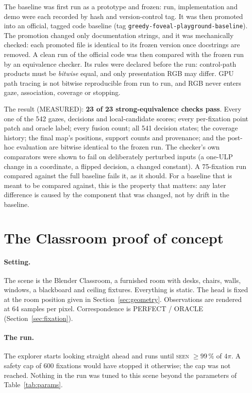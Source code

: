 \documentclass[11pt,a4paper]{article}
\newcommand{\code}[1]{\texttt{\small #1}}
\newcommand{\pct}[1]{#1\,\%}
\begin{document}
The baseline was first run as a prototype and frozen: run, implementation and demo were each recorded by hash and
version-control tag. It was then promoted into an official, tagged code baseline (tag
\code{greedy-foveal-playground-baseline}). The promotion changed only documentation strings, and it was mechanically
checked: each promoted file is identical to its frozen version once docstrings are removed. A clean run of the official
code was then compared with the frozen run by an equivalence checker. Its rules were declared before the run:
control-path products must be \emph{bitwise} equal, and only presentation RGB may differ. GPU path tracing is not
bitwise reproducible from run to run, and RGB never enters gaze, association, coverage or stopping.

The result (MEASURED): \textbf{23 of 23 strong-equivalence checks pass}. Every one of the 542 gazes, decisions and
local-candidate scores; every per-fixation point patch and oracle label; every fusion count; all 541 decision states;
the coverage history; the final map's positions, support counts and provenance; and the post-hoc evaluation are
bitwise identical to the frozen run. The checker's own comparators were shown to fail on deliberately perturbed inputs
(a one-ULP change in a coordinate, a flipped decision, a changed constant). A 75-fixation run compared against the
full baseline fails it, as it should. For a baseline that is meant to be compared against, this is the property that
matters: any later difference is caused by the component that was changed, not by drift in the baseline.

\section{The Classroom proof of concept}\label{sec:classroom}

\paragraph{Setting.} The scene is the Blender Classroom, a furnished room with desks, chairs, walls, windows, a
blackboard and ceiling fixtures. Everything is static. The head is fixed at the room position given in
Section~\ref{sec:geometry}. Observations are rendered at 64 samples per pixel. Correspondence is PERFECT / ORACLE
(Section~\ref{sec:fixation}).

\paragraph{The run.} The explorer starts looking straight ahead and runs until \textsc{seen} $\ge \pct{99}$ of $4\pi$.
A safety cap of 600 fixations would have stopped it otherwise; the cap was not reached. Nothing in the run was tuned to
this scene beyond the parameters of Table~\ref{tab:params}.
\end{document}
